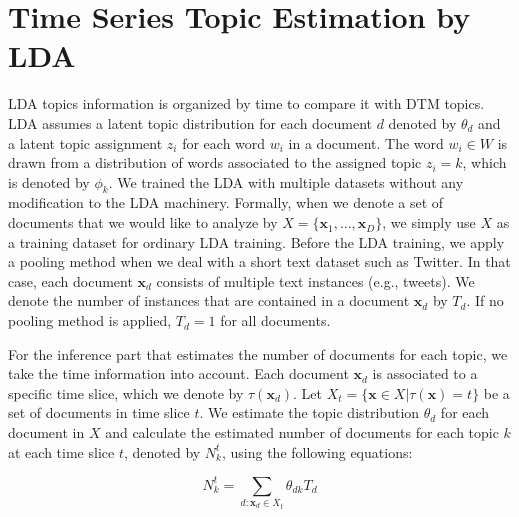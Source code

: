 \documentclass[a4paper]{report}
\begin{document}
\chapter{Time Series Topic Estimation by LDA}
LDA topics information is organized by time to compare it with DTM topics. LDA assumes a latent topic distribution for each document $d$ denoted by $\theta_{d}$ and a latent topic assignment $z_i$ for each word $w_i$ in a document.
The word $w_i \in W$ is drawn from a distribution of words associated to the assigned topic $z_i = k$, which is denoted by $\phi_{k}$.
We trained the LDA with multiple datasets without any modification to the LDA machinery.
Formally, when we denote a set of documents that we would like to analyze by $X = \{\mathbf{x}_1, \dots, \mathbf{x}_D\}$, we simply use $X$ as a training dataset for ordinary LDA training.
Before the LDA training, we apply a pooling method when we deal with a short text dataset such as Twitter.
In that case, each document $\mathbf{x}_d$ consists of multiple text instances (e.g., tweets).
We denote the number of instances that are contained in a document $\mathbf{x}_d$ by $T_d$.
If no pooling method is applied, $T_d = 1$ for all documents.

For the inference part that estimates the number of documents for each topic, we take the time information into account.
Each document $\mathbf{x}_d$ is associated to a specific time slice, which we denote by $\tau(\mathbf{x}_d)$.
Let $X_t = \{ \mathbf{x} \in X | \tau(\mathbf{x}) =  t \}$ be a set of documents in time slice $t$.
We estimate the topic distribution $\theta_{d}$ for each document in $X$ and calculate the estimated number of documents for each topic $k$ at each time slice $t$, denoted by $N_k^t$, using the following equations:

\begin{equation}
N_k^t = \sum_{d: \mathbf{x}_d \in X_t} \theta_{dk}  T_d
\label{eq:N_k_t}
\end{equation} 
\end{document}
